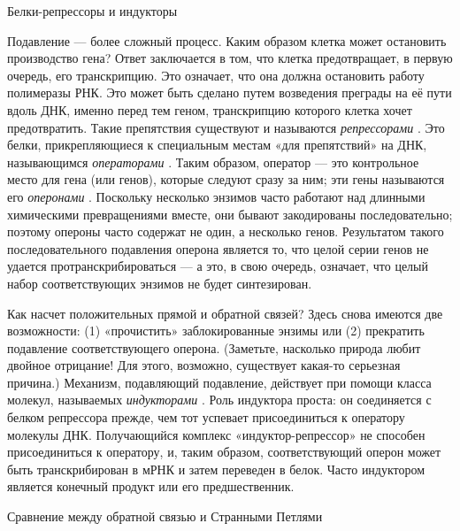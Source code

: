 \documentclass[../main.tex]{subfiles}
\begin{document}
Белки-репрессоры и индукторы

Подавление --- более сложный процесс. Каким образом клетка может остановить производство гена? Ответ заключается в том, что клетка предотвращает, в первую очередь, его транскрипцию. Это означает, что она должна остановить работу полимеразы РНК. Это может быть сделано путем возведения преграды на её пути вдоль ДНК, именно перед тем геном, транскрипцию которого клетка хочет предотвратить. Такие препятствия существуют и называются \emph{репрессорами} . Это белки, прикрепляющиеся к специальным местам «для препятствий» на ДНК, называющимся \emph{операторами} . Таким образом, оператор --- это контрольное место для гена (или генов), которые следуют сразу за ним; эти гены называются его \emph{оперонами} . Поскольку несколько энзимов часто работают над длинными химическими превращениями вместе, они бывают закодированы последовательно; поэтому опероны часто содержат не один, а несколько генов. Результатом такого последовательного подавления оперона является то, что целой серии генов не удается протранскрибироваться --- а это, в свою очередь, означает, что целый набор соответствующих энзимов не будет синтезирован.

Как насчет положительных прямой и обратной связей? Здесь снова имеются две возможности: (1) «прочистить» заблокированные энзимы или (2) прекратить подавление соответствующего оперона. (Заметьте, насколько природа любит двойное отрицание! Для этого, возможно, существует какая-то серьезная причина.) Механизм, подавляющий подавление, действует при помощи класса молекул, называемых \emph{индукторами} . Роль индуктора проста: он соединяется с белком репрессора прежде, чем тот успевает присоединиться к оператору молекулы ДНК. Получающийся комплекс «индуктор-репрессор» не способен присоединиться к оператору, и, таким образом, соответствующий оперон может быть транскрибирован в мРНК и затем переведен в белок. Часто индуктором является конечный продукт или его предшественник.

Сравнение между обратной связью и Странными Петлями
\end{document}
